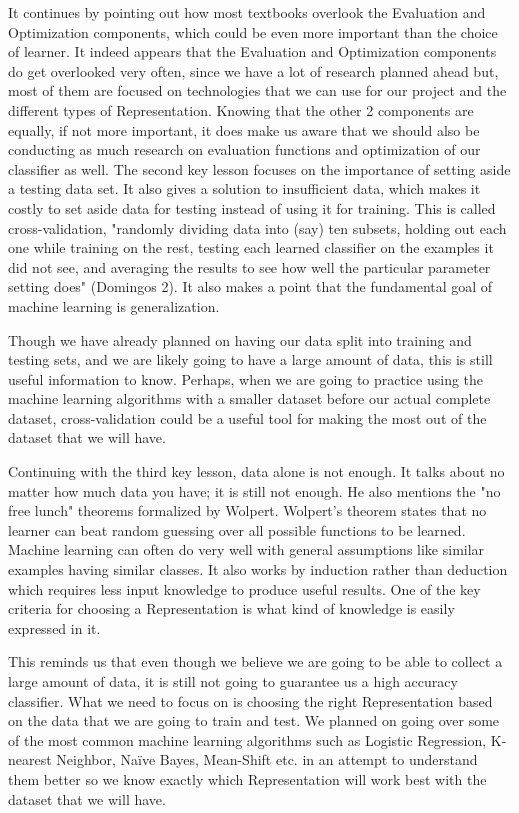 \documentclass[a4paper,12pt]{report}
\begin{document}
It continues by pointing out how most textbooks overlook the Evaluation and Optimization components, which could be even more important than the choice of learner.
It indeed appears that the Evaluation and Optimization components do get overlooked very often, since we have a lot of research planned ahead but, most of them are focused on technologies that we can use for our project and the different types of Representation. Knowing that the other 2 components are equally, if not more important, it does make us aware that we should also be conducting as much research on evaluation functions and optimization of our classifier as well.
The second key lesson focuses on the importance of setting aside a testing data set. It also gives a solution to insufficient data, which makes it costly to set aside data for testing instead of using it for training. This is called cross-validation, "randomly dividing data into (say) ten subsets, holding out each one while training on the rest, testing each learned classifier on the examples it did not see, and averaging the results to see how well the particular parameter setting does" (Domingos 2). It also makes a point that the fundamental goal of machine learning is generalization.

Though we have already planned on having our data split into training and testing sets, and we are likely going to have a large amount of data, this is still useful information to know. Perhaps, when we are going to practice using the machine learning algorithms with a smaller dataset before our actual complete dataset, cross-validation could be a useful tool for making the most out of the dataset that we will have.

Continuing with the third key lesson, data alone is not enough. It talks about no matter how much data you have; it is still not enough. He also mentions the "no free lunch" theorems formalized by Wolpert. Wolpert’s theorem states that no learner can beat random guessing over all possible functions to be learned. Machine learning can often do very well with general assumptions like similar examples having similar classes. It also works by induction rather than deduction which requires less input knowledge to produce useful results. One of the key criteria for choosing a Representation is what kind of knowledge is easily expressed in it.

This reminds us that even though we believe we are going to be able to collect a large amount of data, it is still not going to guarantee us a high accuracy classifier. What we need to focus on is choosing the right Representation based on the data that we are going to train and test. We planned on going over some of the most common machine learning algorithms such as Logistic Regression, K-nearest Neighbor, Naïve Bayes, Mean-Shift etc. in an attempt to understand them better so we know exactly which Representation will work best with the dataset that we will have.
\end{document}
